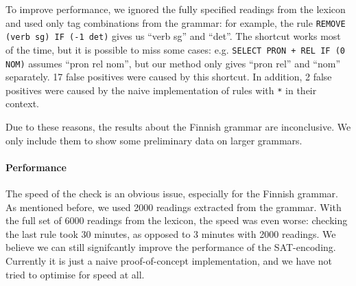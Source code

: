 To improve performance, we ignored the fully specified readings from the
lexicon and used only tag combinations from the grammar:
for example, the rule \texttt{REMOVE (verb sg) IF (-1 det)}
gives us ``verb sg'' and ``det''.
The shortcut works most of the time, but it is possible to
miss some cases: e.g. \texttt{SELECT PRON + REL IF (0 NOM)} 
assumes ``pron rel nom'', but our method only gives
``pron rel'' and ``nom'' separately. 
17 false positives were caused by this shortcut. 
In addition, 2 false positives were caused by the naive implementation of
rules with \verb!*! in their context.

Due to these reasons, the results about the Finnish grammar are
inconclusive. We only include them to show some preliminary data on larger grammars.

\paragraph{Performance} The speed of the check is an obvious issue,
especially for the Finnish grammar. 
As mentioned before, we used 2000 readings extracted from the grammar.
With the full set of 6000 readings from the lexicon, the speed
was even worse: checking the last rule took 30 minutes, as opposed to
3 minutes with 2000 readings. 
We believe we can still signifcantly improve the performance of the SAT-encoding. Currently it is just a naive proof-of-concept implementation, and we have not tried to optimise for speed at all.


